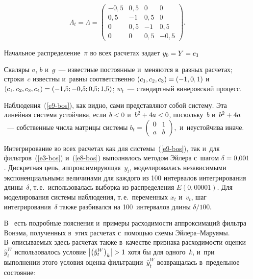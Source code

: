 \begin{multicols}{2}
       \noindent
       $$
       \Lambda_t= \Lambda = 
\begin{pmatrix}
 -0{,}5 &0{,}5& 0&0\\
      0{,}5& -1 & 0{,}5 &0\\
      0& 0{,}5& -1& 0{,}5\\
      0& 0& 0{,}5& -0{,}5
      \end{pmatrix}.
      $$
      
      \vspace*{-2pt}
      
      \noindent
       Начальное распределение~$\pi$ во всех расчетах 
задает $y_0\hm= Y\hm= e_1$
      
      Скаляры $a$, $b$ и~$g$~--- известные по\-сто\-ян\-ные и~меняются в~раз\-ных 
расчетах; строки~$c$ известны и~рав\-ны соответственно $(c_1, c_2, c_3)\hm= 
(-1, 0, 1)$ и~$(c_1, c_2, c_3, c_4)\hm= (-1{,}5; -0{,}5; 0{,}5; 1{,}5)$; $w_t$~--- 
стандартный винеровский процесс.
      
      Наблюдения~(\ref{e9-bos}), как видно, сами пред\-став\-ля\-ют собой сис\-те\-му. Эта 
линейная сис\-те\-ма устойчива, если $b\hm<0$ и~$b^2\hm+ 4a \hm<0$, 
поскольку~$b$ и~$b^2\hm+ 4a$~--- собственные чис\-ла мат\-ри\-цы сис\-те\-мы 
$b_t= 
\begin{pmatrix}
      0&1\\
      a&b
      \end{pmatrix},
      $
      и~неустойчива иначе.
      
      Интегрирование во всех расчетах как для сис\-те\-мы~(\ref{e9-bos}), так и~для 
фильт\-ров~(\ref{e3-bos}) и~(\ref{e8-bos}) выполнялось методом Эйлера с~шагом $\delta\hm= 
0{,}001$. Дискретная цепь, ап\-прок\-си\-ми\-ру\-ющая~$y_t$, моделировалась 
независимыми экспоненциальными величинами для каж\-до\-го из 100 
интервалов интегрирования длины~$\delta$, т.\,е.\ использовалась выборка из 
распределения $E(0{,}00001)$. Для моделирования сис\-те\-мы наблюдения, 
т.\,е.\ переменных $x_t$ и~$v_t$, шаг интегрирования~$\delta$ так\-же 
разбивался на 100~интервалов длины $\delta/100$.
      
      В~\cite{19-bos} есть подробные пояснения и~примеры рас\-хо\-ди\-мости 
аппроксимаций фильт\-ра Вонэма, полученных в~этих расчетах с~по\-мощью 
схемы Эй\-ле\-ра--Ма\-ру\-ямы. В~опи\-сы\-ва\-емых здесь расчетах также 
в~качестве признака рас\-хо\-ди\-мости оценки~$\hat{y}_t^W$ использовалось 
условие $\left\vert \left( \hat{y}_t^W\right)_k\right\vert \hm>1$ хотя бы для 
одного~$k$, и~при выполнении этого условия оценка 
фильт\-ра\-ции~$\hat{y}_t^W$ возвращалась в~предельное со\-сто\-яние: 


\end{multicols}
